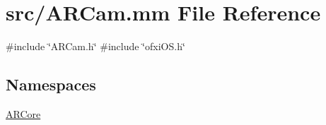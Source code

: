 \hypertarget{_a_r_cam_8mm}{}\section{src/\+A\+R\+Cam.mm File Reference}
\label{_a_r_cam_8mm}
{\ttfamily \#include \char`\"{}A\+R\+Cam.\+h\char`\"{}}\newline
{\ttfamily \#include \char`\"{}ofxi\+O\+S.\+h\char`\"{}}\newline
\subsection*{Namespaces}
\begin{DoxyCompactItemize}
\item 
 \mbox{\hyperlink{namespace_a_r_core}{A\+R\+Core}}
\end{DoxyCompactItemize}
